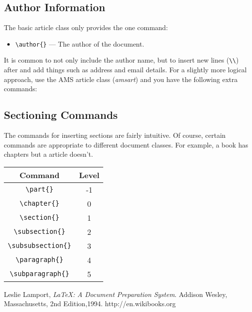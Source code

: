 \documentclass{article}
\begin{document}
\subsection{Author Information}
\label{sec:author-information}

The basic article class only provides the one command:
\begin{itemize}
\item \verb|\author{}| --- The author of the document.
\end{itemize}
It is common to not only include the author name, but to insert new lines (\verb|\\|)
after and add things such as address and email details.  For a slightly more logical
approach, use the AMS article class (\emph{amsart}) and you have the following extra
commands:

\subsection{Sectioning Commands}
\label{sec:sectioning-commands}

The commands for inserting sections are fairly intuitive.  Of course,
certain commands are appropriate to different document classes.
For example, a book has chapters but a article doesn't.
\begin{center}
  \begin{tabular}{|c|c|}
    \hline
    Command & Level \\ \hline
    \verb|\part{}| & -1 \\
    \verb|\chapter{}| & 0 \\
    \verb|\section{}| & 1 \\
    \verb|\subsection{}| & 2 \\
    \verb|\subsubsection{}| & 3 \\
    \verb|\paragraph{}| & 4 \\
    \verb|\subparagraph{}| & 5 \\
    \hline
  \end{tabular}
\end{center}

\begin{thebibliography}{99}
  Leslie Lamport,
  \emph{\LaTeX: A Document Preparation System}.
  Addison Wesley, Massachusetts,
  2nd Edition,1994.
  http://en.wikibooks.org
\end{thebibliography}
\end{document}
